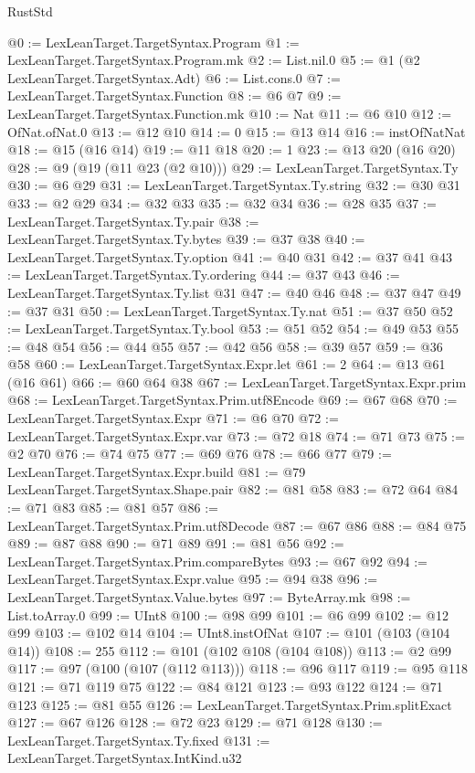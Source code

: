 \begin{lexlean}{RustStd}
\begin{coremodule}
{\begin{coremodule}
{{{{{@0 := LexLeanTarget.TargetSyntax.Program
@1 := LexLeanTarget.TargetSyntax.Program.mk
@2 := List.nil.{0}
@5 := @1 (@2 LexLeanTarget.TargetSyntax.Adt)
@6 := List.cons.{0}
@7 := LexLeanTarget.TargetSyntax.Function
@8 := @6 @7
@9 := LexLeanTarget.TargetSyntax.Function.mk
@10 := Nat
@11 := @6 @10
@12 := OfNat.ofNat.{0}
@13 := @12 @10
@14 := 0
@15 := @13 @14
@16 := instOfNatNat
@18 := @15 (@16 @14)
@19 := @11 @18
@20 := 1
@23 := @13 @20 (@16 @20)
@28 := @9 (@19 (@11 @23 (@2 @10)))
@29 := LexLeanTarget.TargetSyntax.Ty
@30 := @6 @29
@31 := LexLeanTarget.TargetSyntax.Ty.string
@32 := @30 @31
@33 := @2 @29
@34 := @32 @33
@35 := @32 @34
@36 := @28 @35
@37 := LexLeanTarget.TargetSyntax.Ty.pair
@38 := LexLeanTarget.TargetSyntax.Ty.bytes
@39 := @37 @38
@40 := LexLeanTarget.TargetSyntax.Ty.option
@41 := @40 @31
@42 := @37 @41
@43 := LexLeanTarget.TargetSyntax.Ty.ordering
@44 := @37 @43
@46 := LexLeanTarget.TargetSyntax.Ty.list @31
@47 := @40 @46
@48 := @37 @47
@49 := @37 @31
@50 := LexLeanTarget.TargetSyntax.Ty.nat
@51 := @37 @50
@52 := LexLeanTarget.TargetSyntax.Ty.bool
@53 := @51 @52
@54 := @49 @53
@55 := @48 @54
@56 := @44 @55
@57 := @42 @56
@58 := @39 @57
@59 := @36 @58
@60 := LexLeanTarget.TargetSyntax.Expr.let
@61 := 2
@64 := @13 @61 (@16 @61)
@66 := @60 @64 @38
@67 := LexLeanTarget.TargetSyntax.Expr.prim
@68 := LexLeanTarget.TargetSyntax.Prim.utf8Encode
@69 := @67 @68
@70 := LexLeanTarget.TargetSyntax.Expr
@71 := @6 @70
@72 := LexLeanTarget.TargetSyntax.Expr.var
@73 := @72 @18
@74 := @71 @73
@75 := @2 @70
@76 := @74 @75
@77 := @69 @76
@78 := @66 @77
@79 := LexLeanTarget.TargetSyntax.Expr.build
@81 := @79 LexLeanTarget.TargetSyntax.Shape.pair
@82 := @81 @58
@83 := @72 @64
@84 := @71 @83
@85 := @81 @57
@86 := LexLeanTarget.TargetSyntax.Prim.utf8Decode
@87 := @67 @86
@88 := @84 @75
@89 := @87 @88
@90 := @71 @89
@91 := @81 @56
@92 := LexLeanTarget.TargetSyntax.Prim.compareBytes
@93 := @67 @92
@94 := LexLeanTarget.TargetSyntax.Expr.value
@95 := @94 @38
@96 := LexLeanTarget.TargetSyntax.Value.bytes
@97 := ByteArray.mk
@98 := List.toArray.{0}
@99 := UInt8
@100 := @98 @99
@101 := @6 @99
@102 := @12 @99
@103 := @102 @14
@104 := UInt8.instOfNat
@107 := @101 (@103 (@104 @14))
@108 := 255
@112 := @101 (@102 @108 (@104 @108))
@113 := @2 @99
@117 := @97 (@100 (@107 (@112 @113)))
@118 := @96 @117
@119 := @95 @118
@121 := @71 @119 @75
@122 := @84 @121
@123 := @93 @122
@124 := @71 @123
@125 := @81 @55
@126 := LexLeanTarget.TargetSyntax.Prim.splitExact
@127 := @67 @126
@128 := @72 @23
@129 := @71 @128
@130 := LexLeanTarget.TargetSyntax.Ty.fixed
@131 := LexLeanTarget.TargetSyntax.IntKind.u32
}}}}}
\end{coremodule}}
\end{coremodule}
\end{lexlean}
